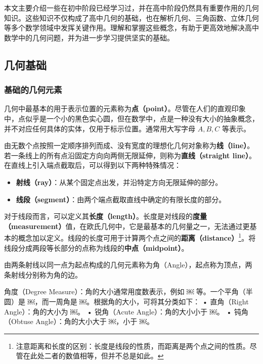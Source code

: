 
\begin{issues}
\issueDraft
\end{issues}

本文主要介绍一些在初中阶段已经学习过，并在高中阶段仍然具有重要作用的几何知识。这些知识不仅构成了高中几何的基础，也在解析几何、三角函数、立体几何等多个数学领域中发挥关键作用。理解和掌握这些概念，有助于更高效地解决高中数学中的几何问题，并为进一步学习提供坚实的基础。

\subsection{几何基础}

\subsubsection{基础的几何元素}

几何中最基本的用于表示位置的元素称为\textbf{点（point）}。尽管在人们的直观印象中，点似乎是一个小的黑色实心圆，但在数学中，点是一种没有大小的抽象概念，并不对应任何具体的实体，仅用于标示位置。通常用大写字母  $A, B, C$  等表示。

由无数个点按照一定顺序排列而成、没有宽度的理想化几何对象称为\textbf{线（line）}。若一条线上的所有点沿固定方向向两侧无限延伸，则称为\textbf{直线（straight line）}。在直线上引入端点截取后，可以得到以下两种特殊情况：

\begin{itemize}
\item \textbf{射线（ray）}：从某个固定点出发，并沿特定方向无限延伸的部分。
\item \textbf{线段（segment）}：由两个端点截取直线中确定的有限长度的部分。
\end{itemize}

对于线段而言，可以定义其\textbf{长度（length）}。长度是对线段的\textbf{度量（measurement）}值，在欧氏几何中，它是最基本的几何量之一，无法通过更基本的概念加以定义。线段的长度可用于计算两个点之间的\textbf{距离（distance）}\footnote{注意距离和长度的区别：长度是线段的性质，而距离是两个点之间的性质。尽管在此处二者的数值相等，但并不总是如此。}。将线段分成两段等长部分的点称为线段的\textbf{中点（midpoint）}。


由两条射线以同一点为起点构成的几何元素称为角（Angle），起点称为顶点，两条射线分别称为角的边。

角度（Degree Measure）：角的大小通常用度数表示，例如 ￼ 等。一个平角（半圆）是 ￼，而一周角是 ￼。根据角的大小，可将其分类如下：
	•	直角（Right Angle）：角的大小为 ￼。
	•	锐角（Acute Angle）：角的大小小于 ￼。
	•	钝角（Obtuse Angle）：角的大小大于 ￼，小于 ￼。


